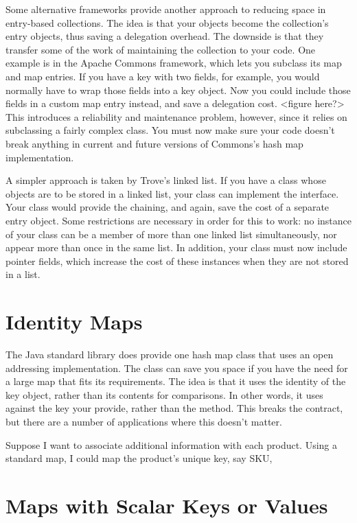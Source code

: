 Some alternative frameworks provide another approach to reducing space in
entry-based collections. The idea is that your objects become
the collection's entry objects, thus saving a delegation overhead. The downside
is that they transfer some of the work of maintaining the collection to your code.
One example is in the Apache Commons framework, which lets you subclass its map
and map entries. If you have a key with two fields, for example, you would
normally have to wrap those fields into a key object. Now 
you could include those fields in a custom map entry instead, and save a
delegation cost. <figure here?>  This introduces a reliability and maintenance
problem, however, since it relies on subclassing a fairly complex class. You must now make sure
your code doesn't break anything in current and future versions of Commons's
hash map implementation.

A simpler approach is taken by Trove's linked list. If you have a class whose
objects are to be stored in a linked list, your class can implement the
 interface. Your class would provide the chaining, and
again, save the cost of a separate entry object.  Some restrictions are
necessary in order for this to work: no instance of your class can
be a member of more than one linked list simultaneously, nor appear more than
once in the same list. In addition, your class must now include
pointer fields, which increase the cost of these instances when they are
not stored in a list.

\section{Identity Maps}
The Java standard library does provide one hash map class that uses an open
addressing implementation. The  class can save you space
if you have the need for a large map that fits its requirements.  The idea is that
it uses the identity of the key object, 
rather than its contents for comparisons. In
other words, it uses \code{==} against the key your provide, rather than the
 method. This breaks the  contract, but there are a
number of applications where this doesn't matter.

Suppose I want to associate additional information with each product.  Using a
standard map, I could map the product's unique key, say SKU, 



\section{Maps with Scalar Keys or Values}

